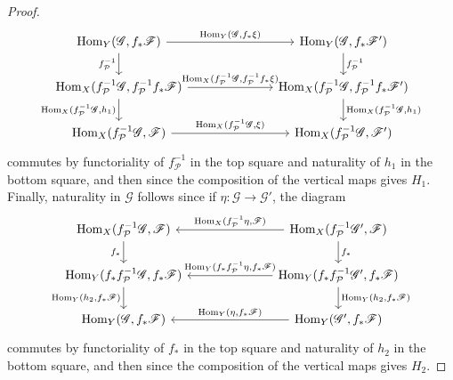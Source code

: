 \documentclass[12pt,letterpaper]{article}
\theoremstyle{definition}
\theoremstyle{remark}
\numberwithin{equation}{section}
\numberwithin{figure}{problem}
\DeclareMathOperator{\Hom}{Hom}
\begin{document}
\begin{proof}
\begin{equation*}
\begin{tikzcd}[column sep=16ex]
      \Hom_Y(\mathscr{G},f_*\mathscr{F}) \rar{\Hom_Y(\mathscr{G},f_*\xi)}\dar[swap]{f_\mathcal{P}^{-1}} & \Hom_Y(\mathscr{G},f_*\mathscr{F}')\dar{f_\mathcal{P}^{-1}}\\
      \Hom_X(f_\mathcal{P}^{-1}\mathscr{G},f_\mathcal{P}^{-1}f_*\mathscr{F}) \rar{\Hom_X(f_\mathcal{P}^{-1}\mathscr{G},f_\mathcal{P}^{-1}f_*\xi)} \dar[swap]{\Hom_X(f_\mathcal{P}^{-1}\mathscr{G},h_1)} & \Hom_X(f_\mathcal{P}^{-1}\mathscr{G},f_\mathcal{P}^{-1}f_*\mathscr{F}')\dar{\Hom_X(f_\mathcal{P}^{-1}\mathscr{G},h_1)}\\
      \Hom_X(f_\mathcal{P}^{-1}\mathscr{G},\mathscr{F}) \rar{\Hom_X(f_\mathcal{P}^{-1}\mathscr{G},\xi)} & \Hom_X(f_\mathcal{P}^{-1}\mathscr{G},\mathscr{F}')
    \end{tikzcd}
  \end{equation*}
  commutes by functoriality of $f_\mathcal{P}^{-1}$ in the top square and naturality of $h_1$ in the bottom square, and then since the composition of the vertical maps gives $H_1$. Finally, naturality in $\mathscr{G}$ follows since if $\eta\colon\mathscr{G} \to \mathscr{G}'$, the diagram
  \begin{equation*}
    \begin{tikzcd}[column sep=16ex]
      \Hom_X(f^{-1}_\mathcal{P}\mathscr{G},\mathscr{F})\dar[swap]{f_*} & \Hom_X(f^{-1}_\mathcal{P}\mathscr{G}',\mathscr{F}) \arrow{l}[swap]{\Hom_X(f_\mathcal{P}^{-1}\eta,\mathscr{F})}\dar{f_*}\\
      \Hom_Y(f_*f^{-1}_\mathcal{P}\mathscr{G},f_*\mathscr{F})\dar[swap]{\Hom_Y(h_2,f_*\mathscr{F})} & \Hom_Y(f_*f^{-1}_\mathcal{P}\mathscr{G}',f_*\mathscr{F}) \arrow{l}[swap]{\Hom_Y(f_*f_\mathcal{P}^{-1}\eta,f_*\mathscr{F})}\dar{\Hom_Y(h_2,f_*\mathscr{F})}\\
      \Hom_Y(\mathscr{G},f_*\mathscr{F}) & \Hom_Y(\mathscr{G}',f_*\mathscr{F}) \arrow{l}[swap]{\Hom_Y(\eta,f_*\mathscr{F})}
    \end{tikzcd}
  \end{equation*}
  commutes by functoriality of $f_*$ in the top square and naturality of $h_2$ in the bottom square, and then since the composition of the vertical maps gives $H_2$.
\end{proof}
\end{document}
